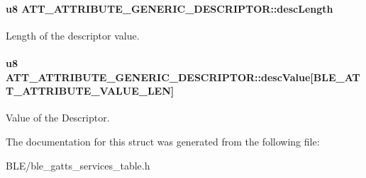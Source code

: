 \paragraph[{\texorpdfstring{desc\+Length}{descLength}}]{\setlength{\rightskip}{0pt plus 5cm}u8 A\+T\+T\+\_\+\+A\+T\+T\+R\+I\+B\+U\+T\+E\+\_\+\+G\+E\+N\+E\+R\+I\+C\+\_\+\+D\+E\+S\+C\+R\+I\+P\+T\+O\+R\+::desc\+Length}\hypertarget{struct_a_t_t___a_t_t_r_i_b_u_t_e___g_e_n_e_r_i_c___d_e_s_c_r_i_p_t_o_r_a4e869327d516189a47dc16a96ea8cfaa}{}\label{struct_a_t_t___a_t_t_r_i_b_u_t_e___g_e_n_e_r_i_c___d_e_s_c_r_i_p_t_o_r_a4e869327d516189a47dc16a96ea8cfaa}
Length of the descriptor value. 
\paragraph[{\texorpdfstring{desc\+Value}{descValue}}]{\setlength{\rightskip}{0pt plus 5cm}u8 A\+T\+T\+\_\+\+A\+T\+T\+R\+I\+B\+U\+T\+E\+\_\+\+G\+E\+N\+E\+R\+I\+C\+\_\+\+D\+E\+S\+C\+R\+I\+P\+T\+O\+R\+::desc\+Value\mbox{[}{\bf B\+L\+E\+\_\+\+A\+T\+T\+\_\+\+A\+T\+T\+R\+I\+B\+U\+T\+E\+\_\+\+V\+A\+L\+U\+E\+\_\+\+L\+EN}\mbox{]}}\hypertarget{struct_a_t_t___a_t_t_r_i_b_u_t_e___g_e_n_e_r_i_c___d_e_s_c_r_i_p_t_o_r_a1cbfb09ed8e9cac3af4d1e5fe121ecee}{}\label{struct_a_t_t___a_t_t_r_i_b_u_t_e___g_e_n_e_r_i_c___d_e_s_c_r_i_p_t_o_r_a1cbfb09ed8e9cac3af4d1e5fe121ecee}
Value of the Descriptor. 

The documentation for this struct was generated from the following file\+:\begin{DoxyCompactItemize}
\item 
B\+L\+E/ble\+\_\+gatts\+\_\+services\+\_\+table.\+h\end{DoxyCompactItemize}
